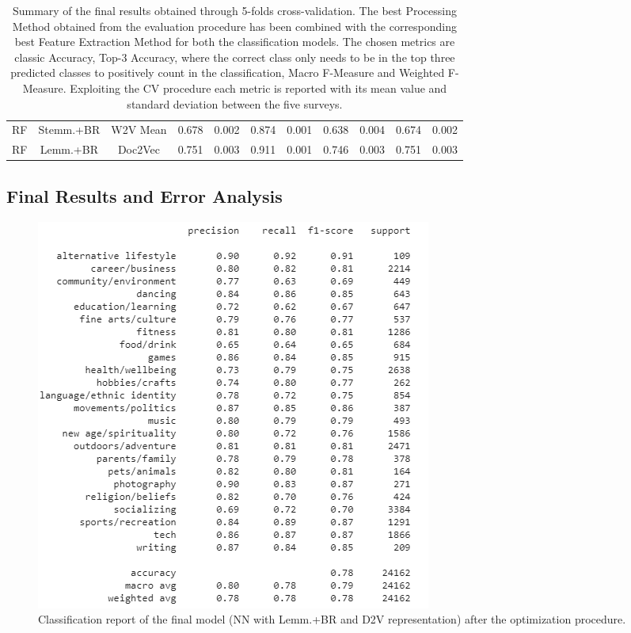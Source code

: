 \documentclass[10pt]{article}
\begin{document}
\begin{table}[]
{\begin{tabular}{ccccccccccc}
RF                        & Stemm.+BR      & W2V Mean                  & 0.678      & 0.002      & 0.874         & 0.001         & 0.638            & 0.004            & 0.674              & 0.002             \\
RF                        & Lemm.+BR & Doc2Vec                   & 0.751      & 0.003      & 0.911         & 0.001         & 0.746            & 0.003            & 0.751              & 0.003             \\ \hline
\end{tabular}
}
\caption{Summary of the final results obtained through 5-folds cross-validation. The best Processing Method obtained from the evaluation procedure has been combined with the corresponding best Feature Extraction Method for both the classification models. The chosen metrics are classic Accuracy, Top-3 Accuracy, where the correct class only needs to be in the top three predicted classes to positively count in the classification, Macro F-Measure and Weighted F-Measure. Exploiting the CV procedure each metric is reported with its mean value and standard deviation between the five surveys.}
\label{tab:results}
\end{table}



\subsection{Final Results and Error Analysis}
\begin{figure}
\centering
\includegraphics[scale=0.9]{figs/classification_report.png}
\caption{Classification report of the final model (NN with Lemm.+BR and D2V representation) after the optimization procedure.}
\label{fig:classification_report}
\end{figure}
\end{document}
